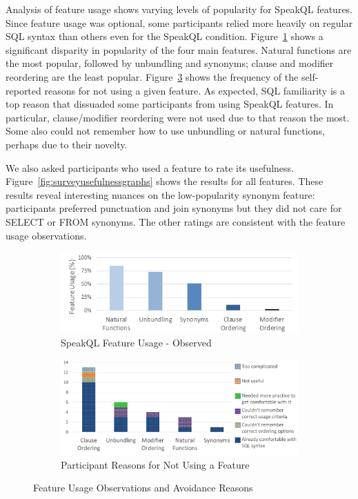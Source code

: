 Analysis of feature usage shows varying levels of popularity for SpeakQL features. 
Since feature usage was optional, some participants relied more heavily on regular SQL syntax than others even for the SpeakQL condition. 
Figure~\ref{fig:featureusage} shows a significant disparity in popularity of the four main features. 
Natural functions are the most popular, followed by unbundling and synonyms; clause and modifier reordering are the least popular. 
Figure~\ref{fig:unusedfeatures} shows the frequency of the self-reported reasons for not using a given feature.
As expected, SQL familiarity is a top reason that dissuaded some participants from using SpeakQL features. 
In particular, clause/modifier reordering were not used due to that reason the most. 
Some also could not remember how to use unbundling or natural functions, perhaps due to their novelty.

We also asked participants who used a feature to rate its usefulness. 
Figure~\ref{fig:surveyusefulnessgraphs} shows the results for all features. 
These results reveal interesting nuances on the low-popularity synonym feature: participants preferred punctuation and join synonyms but they did not care for SELECT or FROM synonyms. 
The other ratings are consistent with the feature usage observations. 


\begin{figure}
\begin{subfigure}{\linewidth}
  \centering
  \includegraphics[width=\linewidth]{figures/feature_usage.png}
  \caption{SpeakQL Feature Usage - Observed}
  \label{fig:featureusage}
\end{subfigure}
\begin{subfigure}{\linewidth}
  \centering
  \includegraphics[width=\linewidth]{figures/feature_unused_reasons_excel.png}
  \caption{Participant Reasons for Not Using a Feature}
  \label{fig:unusedfeatures}
\end{subfigure}
\caption{Feature Usage Observations and Avoidance Reasons}
\end{figure}

